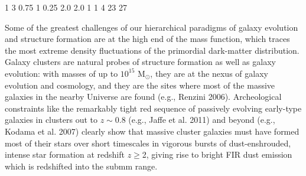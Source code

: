 \documentclass[11pt,a4]{article}
\begin{document}
%
\NIKAparams
 {1}    %
 {3}  %
 {0.75}  %
 {1}  %
 {0.25}  %
 {2.0}  %
 {2.0}  %
%
\NIKAtimes
 {1}          %
 {1}          %
 {4}          %
 {23}         %
 {27}        %
 {} %
%
%
\techsheetPV
%
\maketitle



\noindent Some of the greatest challenges of our hierarchical paradigms
of galaxy evolution and structure formation are at the high end of the
mass function, which traces the most extreme density fluctuations of
the primordial dark-matter distribution. Galaxy clusters are natural
probes of structure formation as well as galaxy evolution: with masses
of up to $10^{15}$ M$_{\odot}$, they are at the nexus of galaxy
evolution and cosmology, and they are the sites where most of the
massive galaxies in the nearby Universe are found (e.g., Renzini
2006). Archeological constraints like the remarkably tight red
sequence of passively evolving early-type galaxies in clusters out to
$z\sim$0.8 (e.g., Jaffe et al. 2011) and beyond (e.g., Kodama et
al. 2007) clearly show that massive cluster galaxies must have formed
most of their stars over short timescales in vigorous bursts of
dust-enshrouded, intense star formation at redshift $z\ge$2, giving
rise to bright FIR dust emission which is redshifted into the submm
range. 
\end{document}
